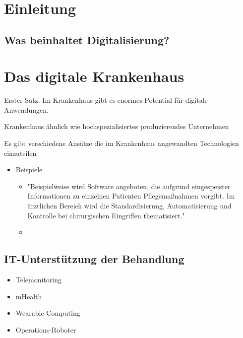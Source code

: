 
{}
\section{Einleitung}
	\subsection{Was beinhaltet Digitalisierung?}
	\parencite[11]{braeutigam2017}
\section{Das digitale Krankenhaus}
	Erster Satz. Im Krankenhaus gibt es enormes Potential für digitale Anwendungen. 

	Krankenhaus ähnlich wie hochspezialisiertes produzierendes Unternehmen

	Es gibt verschiedene Ansätze die im Krankenhaus angewandten Technologien einzuteilen


	\begin{itemize}
		\item Beispiele
		\begin{itemize}
			\item "Beispielweise wird Software angeboten, die aufgrund eingespeister Informationen zu einzelnen Patienten Pflegemaßnahmen vorgibt. Im ärztlichen Bereich wird die Standardisierung, Automatisierung und Kontrolle bei chirurgischen Eingriffen thematisiert." \parencite[16]{braeutigam2017}
			\item 
		\end{itemize}
	\end{itemize}
	\subsection{IT-Unterstützung der Behandlung}
	\parencite[51]{oswald2019} \parencite[14]{braeutigam2017}
	\begin{itemize}
		\item Telemonitoring
		\item mHealth
		\item Wearable Computing
		\item Operations-Roboter
	\end{itemize}
